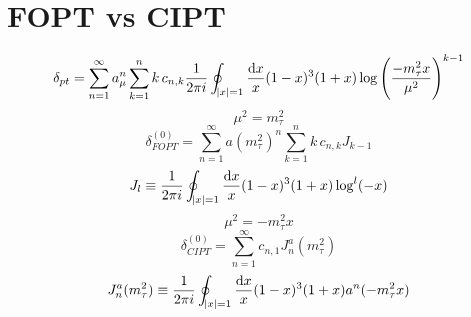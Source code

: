 \documentclass[12pt,a4paper]{scrreprt}
\begin{document}
\section{FOPT vs CIPT}
\begin{equation*}
  \delta_{pt} = \sum_{n=1}^\infty a_\mu^n \sum_{k=1}^n k\, c_{n,k} \frac{1}{2\pi i} \oint_{\abs{x}=1} \frac{\dif x}{x} (1-x)^3 (1+x) \log\left( \frac{- m_\tau^2 x}{\mu^2} \right)^{k-1}
\end{equation*}
\begin{equation*}
  \mu^2 = m_\tau^2
\end{equation*}
\begin{equation*}
  \delta_{FOPT}^{(0)} = \sum_{n=1}^\infty a(m_\tau^2)^n \sum_{k=1}^n k\, c_{n,k} J_{k-1}
\end{equation*}
\begin{equation*}
  J_l \equiv \frac{1}{2 \pi i} \oint_{\abs{x}=1} \frac{\dif x}{x} (1-x)^3(1+x) \log^l(-x)
\end{equation*}
\begin{equation*}
  \mu^2 = -m_\tau^2 x
\end{equation*}
\begin{equation*}
  \delta_{CIPT}^{(0)} = \sum_{n=1}^\infty c_{n,1} J_n^a(m_\tau^2)
\end{equation*}
\begin{equation*}
  J_n^a(m_\tau^2) \equiv \frac{1}{2\pi i} \oint_{\abs{x}=1} \frac{\dif x}{x} (1-x)^3 (1+x) a^n (-m_\tau^2 x)
\end{equation*}
\end{document}
